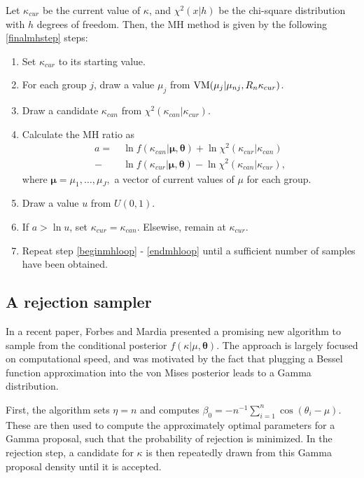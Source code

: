 \documentclass[]{gSCS2e}
\theoremstyle{plain}
\theoremstyle{definition}
\theoremstyle{remark}
\begin{document}
Let $\kappa_{cur}$ be the current value of $\kappa$, and $\chi^2(x \vert h)$ be the chi-square distribution with $h$ degrees of freedom. Then, the MH method is given by the following \ref{finalmhstep} steps:


\begin{enumerate}
\item Set $\kappa_{cur}$ to its starting value.
\item For each group $j$, draw a value $\mu_{j}$ from $\textnormal{VM}(\mu_{j} \vert \mu_{nj}, R_n\kappa_{cur})$. \label{beginmhloop}
\item Draw a candidate $\kappa_{can}$ from $\chi^2(\kappa_{can} \vert \kappa_{cur})$. 
\item Calculate the MH ratio as 
\begin{align*}
a = ~& \ln f(\kappa_{can} \vert \boldsymbol{\mu}, \boldsymbol\theta) + \ln  \chi^2(\kappa_{cur} \vert \kappa_{can}) \\
   - & \ln f(\kappa_{cur} \vert \boldsymbol{\mu}, \boldsymbol\theta) - \ln \chi^2(\kappa_{can} \vert \kappa_{cur}),
\end{align*}
where $\boldsymbol\mu = \mu_1, \dots, \mu_J,$ a vector of current values of $\mu$ for each group.
\item Draw a value $u$ from $U(0,1)$. 
\item If $a > \ln u $, set $\kappa_{cur} = \kappa_{can}$. Elsewise, remain at $\kappa_{cur}$. \label{endmhloop}
\item Repeat step \ref{beginmhloop} - \ref{endmhloop} until a sufficient number of samples have been obtained. \label{finalmhstep}
\end{enumerate}


\subsection{A rejection sampler \label{fm}}

In a recent paper, Forbes and Mardia \cite{forbes2014fast} presented a promising new algorithm to sample from the conditional posterior $f(\kappa \vert \mu, \boldsymbol\theta)$. The approach is largely focused on computational speed, and was motivated by the fact that plugging a Bessel function approximation into the von Mises posterior leads to a Gamma distribution.

First, the algorithm sets $\eta = n$ and computes $\beta_0 = - n^{-1} \sum_{i=1}^{n} \cos(\theta_i - \mu)$. These are then used to compute the approximately optimal parameters for a Gamma proposal, such that the probability of rejection is minimized. In the rejection step, a candidate for $\kappa$ is then repeatedly drawn from this Gamma proposal density until it is accepted. 
\end{document}
